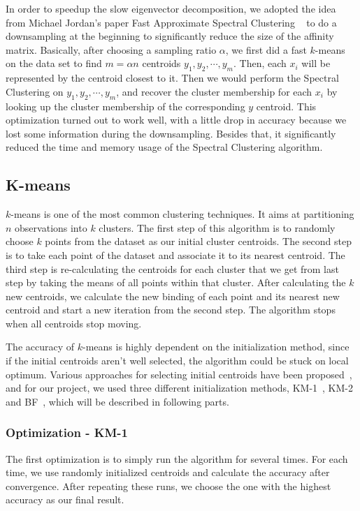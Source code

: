 \documentclass{acm_proc_article-sp}
\begin{document}
In order to speedup the slow eigenvector decomposition, we adopted the idea from Michael Jordan's paper Fast Approximate Spectral Clustering ~\cite{yan2009fast} to do a downsampling at the beginning to significantly reduce the size of the affinity matrix. Basically, after choosing a sampling ratio $\alpha$, we first did a fast $k$-means on the data set to find $m = \alpha n$ centroids $y_1, y_2, \cdots, y_m$. Then, each $x_i$ will be represented by the centroid closest to it. Then we would perform the Spectral Clustering on $y_1, y_2, \cdots, y_m$, and recover the cluster membership for each $x_i$ by looking up the cluster membership of the corresponding $y$ centroid. This optimization turned out to work well, with a little drop in accuracy because we lost some information during the downsampling. Besides that, it significantly reduced the time and memory usage of the Spectral Clustering algorithm.

\subsection{K-means}
$k$-means is one of the most common clustering techniques. It aims at partitioning $n$ observations into $k$ clusters. The first step of this algorithm is to randomly choose $k$ points from the dataset as our initial cluster centroids. The second step is to take each point of the dataset and associate it to its nearest centroid. The third step is re-calculating the centroids for each cluster that we get from last step by taking the means of all points within that cluster. After calculating the $k$ new centroids, we calculate the new binding of each point and its nearest new centroid and start a new iteration from the second step. The algorithm stops when all centroids stop moving.

The accuracy of $k$-means is highly dependent on the initialization method, since if the initial centroids aren't well selected, the algorithm could be stuck on local optimum. Various approaches for selecting initial centroids have been proposed~\cite{kanungo2002efficient, arthur2007k, khan2004cluster}, and for our project, we used three different initialization methods, KM-1~\cite{hartigan1979algorithm}, KM-2~\cite{yan2009fast} and BF~\cite{bradley1998refining}, which will be described in following parts.

\subsubsection{Optimization - KM-1}
The first optimization is to simply run the algorithm for several times. For each time, we use randomly initialized centroids and calculate the accuracy after convergence. After repeating these runs, we choose the one with the highest accuracy as our final result.
\end{document}
